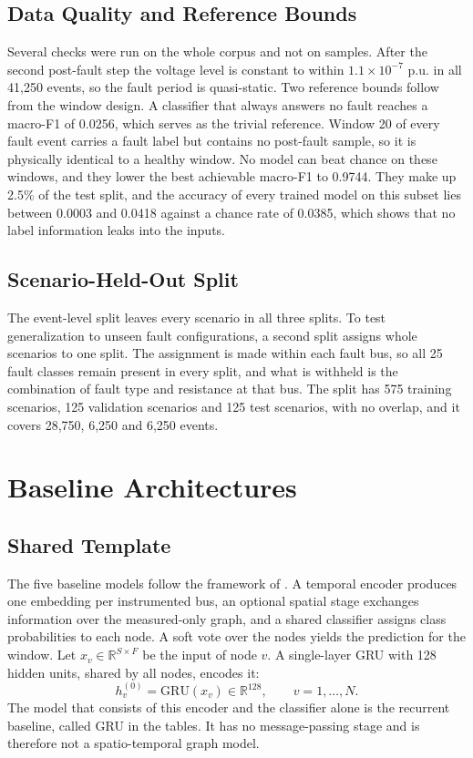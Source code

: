 \documentclass[MTech]{ugthesis}
\begin{document}
\subsection{Data Quality and Reference Bounds}

Several checks were run on the whole corpus and not on samples. After the second post-fault step the voltage level is constant to within $1.1\times10^{-7}$ p.u. in all 41,250 events, so the fault period is quasi-static. Two reference bounds follow from the window design. A classifier that always answers no fault reaches a macro-F1 of 0.0256, which serves as the trivial reference. Window 20 of every fault event carries a fault label but contains no post-fault sample, so it is physically identical to a healthy window. No model can beat chance on these windows, and they lower the best achievable macro-F1 to 0.9744. They make up 2.5\% of the test split, and the accuracy of every trained model on this subset lies between 0.0003 and 0.0418 against a chance rate of 0.0385, which shows that no label information leaks into the inputs.

\subsection{Scenario-Held-Out Split}
\label{sec:scenario}

The event-level split leaves every scenario in all three splits. To test generalization to unseen fault configurations, a second split assigns whole scenarios to one split. The assignment is made within each fault bus, so all 25 fault classes remain present in every split, and what is withheld is the combination of fault type and resistance at that bus. The split has 575 training scenarios, 125 validation scenarios and 125 test scenarios, with no overlap, and it covers 28,750, 6,250 and 6,250 events.

\section{Baseline Architectures}
\label{sec:baselines}

\subsection{Shared Template}

The five baseline models follow the framework of \citet{karabulut2026}. A temporal encoder produces one embedding per instrumented bus, an optional spatial stage exchanges information over the measured-only graph, and a shared classifier assigns class probabilities to each node. A soft vote over the nodes yields the prediction for the window. Let $x_v\in\mathbb{R}^{S\times F}$ be the input of node $v$. A single-layer \ac{GRU} with 128 hidden units, shared by all nodes, encodes it:
\begin{equation}
h_v^{(0)}=\mathrm{GRU}(x_v)\in\mathbb{R}^{128},\qquad v=1,\dots,N.
\label{eq:gru}
\end{equation}
The model that consists of this encoder and the classifier alone is the recurrent baseline, called GRU in the tables. It has no message-passing stage and is therefore not a spatio-temporal graph model.
\end{document}

